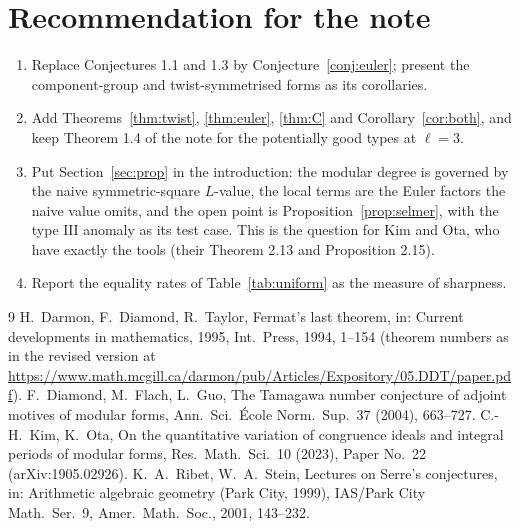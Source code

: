 \documentclass[11pt]{amsart}
\theoremstyle{definition}
\begin{document}
\section{Recommendation for the note}\label{sec:rec}
\begin{enumerate}
\item Replace Conjectures 1.1 and 1.3 by Conjecture~\ref{conj:euler}; present the component-group and twist-symmetrised forms as its corollaries.
\item Add Theorems~\ref{thm:twist}, \ref{thm:euler}, \ref{thm:C} and Corollary~\ref{cor:both}, and keep Theorem 1.4 of the note for the potentially good types at $\ell=3$.
\item Put Section~\ref{sec:prop} in the introduction: the modular degree is governed by the naive symmetric-square $L$-value, the local terms are the Euler factors the naive value omits, and the open point is Proposition~\ref{prop:selmer}, with the type $\mathrm{III}$ anomaly as its test case. This is the question for Kim and Ota, who have exactly the tools (their Theorem 2.13 and Proposition 2.15).
\item Report the equality rates of Table~\ref{tab:uniform} as the measure of sharpness.
\end{enumerate}

\begin{thebibliography}{9}
 H.~Darmon, F.~Diamond, R.~Taylor, Fermat's last theorem, in: Current developments in mathematics, 1995, Int.\ Press, 1994, 1--154 (theorem numbers as in the revised version at \url{https://www.math.mcgill.ca/darmon/pub/Articles/Expository/05.DDT/paper.pdf}).
 F.~Diamond, M.~Flach, L.~Guo, The Tamagawa number conjecture of adjoint motives of modular forms, Ann.\ Sci.\ \'Ecole Norm.\ Sup.\ 37 (2004), 663--727.
 C.-H.~Kim, K.~Ota, On the quantitative variation of congruence ideals and integral periods of modular forms, Res.\ Math.\ Sci.\ 10 (2023), Paper No.\ 22 (arXiv:1905.02926).
 K.~A.~Ribet, W.~A.~Stein, Lectures on Serre's conjectures, in: Arithmetic algebraic geometry (Park City, 1999), IAS/Park City Math.\ Ser.\ 9, Amer.\ Math.\ Soc., 2001, 143--232.
\end{thebibliography}
\end{document}
